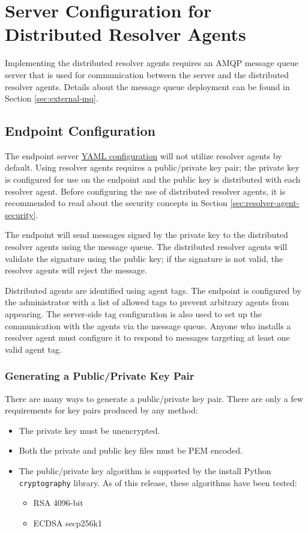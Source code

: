 \section{Server Configuration for Distributed Resolver Agents}\label{sec:resolver-server}

Implementing the distributed resolver agents requires an AMQP message queue server that
is used for communication between the \cxoneflow server and the distributed resolver
agents.  Details about the message queue deployment can be found in Section \ref{sec:external-mq}.

\subsection{\cxoneflow Endpoint Configuration}

The endpoint server \hyperref[sec:yaml-config]{YAML configuration} will not utilize resolver agents
by default.  Using resolver agents requires a public/private key pair; the private key is configured
for use on the \cxoneflow endpoint and the public key is distributed with each resolver agent.  Before
configuring the use of distributed resolver agents, it is recommended to read about the security
concepts in Section \ref{sec:resolver-agent-security}.

The \cxoneflow endpoint will send messages signed by the private key to the distributed resolver
agents using the message queue.  The distributed resolver agents will validate the signature
using the public key; if the signature is not valid, the resolver agents will reject the message.

Distributed agents are identified using agent tags.  The \cxoneflow endpoint is configured by the
administrator with a list of allowed tags to prevent arbitrary agents from appearing.  The
server-side tag configuration is also used to set up the communication with the agents via
the message queue.  Anyone who installs a resolver agent must configure it to respond to messages
targeting at least one valid agent tag.


\subsubsection{Generating a Public/Private Key Pair}\label{ref:server-key-pair}

There are many ways to generate a public/private key pair.  There are only a few requirements
for key pairs produced by any method:

\begin{itemize}
  \item The private key must be unencrypted.
  \item Both the private and public key files must be PEM encoded.
  \item The public/private key algorithm is supported by the install Python \texttt{cryptography} library.
    As of this release, these algorithms have been tested:
  \begin{itemize}
      \item RSA 4096-bit
      \item ECDSA secp256k1
  \end{itemize}
\end{itemize}

